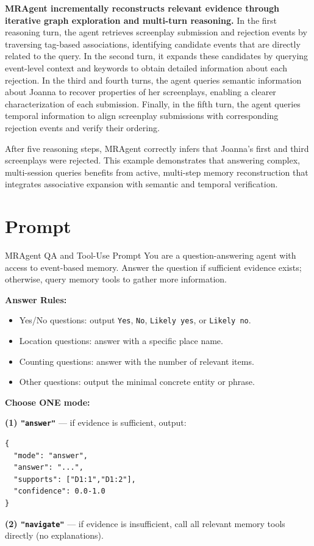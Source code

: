 \textbf{MRAgent incrementally reconstructs relevant evidence through iterative
graph exploration and multi-turn reasoning.}
In the first reasoning turn, the agent retrieves screenplay submission and
rejection events by traversing tag-based associations, identifying candidate
events that are directly related to the query.
In the second turn, it expands these candidates by querying event-level context
and keywords to obtain detailed information about each rejection.
In the third and fourth turns, the agent queries semantic information about
Joanna to recover properties of her screenplays, enabling a clearer
characterization of each submission.
Finally, in the fifth turn, the agent queries temporal information to align
screenplay submissions with corresponding rejection events and verify their
ordering.

After five reasoning steps, MRAgent correctly infers that Joanna’s first and
third screenplays were rejected.
This example demonstrates that answering complex, multi-session queries
benefits from active, multi-step memory reconstruction that integrates
associative expansion with semantic and temporal verification.
\section{Prompt}

\begin{promptbox}{MRAgent QA and Tool-Use Prompt}
You are a question-answering agent with access to event-based memory.
Answer the question if sufficient evidence exists; otherwise, query memory tools to gather more information.

\textbf{Answer Rules:}
\begin{itemize}[leftmargin=1.25em,itemsep=2pt,topsep=2pt]
  \item Yes/No questions: output \texttt{Yes}, \texttt{No}, \texttt{Likely yes}, or \texttt{Likely no}.
  \item Location questions: answer with a specific place name.
  \item Counting questions: answer with the number of relevant items.
  \item Other questions: output the minimal concrete entity or phrase.
\end{itemize}

\textbf{Choose ONE mode:}

\textbf{(1) \texttt{"answer"}} — if evidence is sufficient, output:
\begin{lstlisting}[style=json]
{
  "mode": "answer",
  "answer": "...",
  "supports": ["D1:1","D1:2"],
  "confidence": 0.0-1.0
}
\end{lstlisting}

\textbf{(2) \texttt{"navigate"}} — if evidence is insufficient, call all relevant memory tools directly (no explanations).
\end{promptbox}

